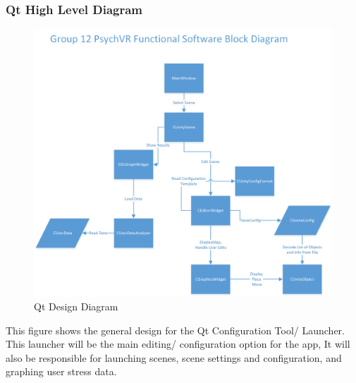\documentclass[a4paper,10pt]{article}
\begin{document}
		\subsubsection{Qt High Level Diagram}
		\begin{figure}[H]
					\includegraphics[width=\linewidth,height=\paperheight,keepaspectratio]{qtConfigDiag.png}
					\caption{Qt Design Diagram}
					\label{fig:qtHighLevel}
				\end{figure}
This figure shows the general design for the Qt Configuration Tool/ Launcher. This launcher will be the main editing/ configuration option for the app, It will also be responsible for launching scenes, scene settings and configuration, and graphing user stress data.

		\pagebreak
\end{document}
